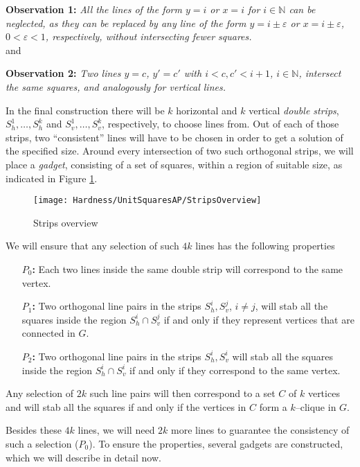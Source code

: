 \documentclass[12pt]{article}
\newcommand{\eps}{\varepsilon}
\newcommand{\N}{\mathbb{N}}
\begin{document}
\textbf{Observation 1:}
\emph{All the lines of the form $y = i$ or $x = i$ for $i \in \N$ can be neglected, as they can be replaced by any line of the form $y = i \pm \eps$ or $x = i \pm \eps$, $0 < \eps < 1$, respectively, without intersecting fewer squares.
}\\
and

\textbf{Observation 2:}
\emph{Two lines $y = c$, $y' = c'$ with $i < c, c' < i+1$, $i \in \N$, intersect the same squares, and analogously for vertical lines.}

In the final construction there will be $k$ horizontal and $k$ vertical \textit{double strips}, $S_h^1,\dots, S_h^k$ and $S_v^1,\dots, S_v^k$, respectively, to choose lines from. Out of each of those strips, two ``consistent'' lines will have to be chosen in order to get a solution of the specified size. Around every intersection of two such orthogonal strips, we will place a \textit{gadget}, consisting of a set of squares, within a region of suitable size, as indicated in Figure \ref{fig:StripsOverview}.
\begin{figure}[ht]
	\centering
		\texttt{[image: Hardness/UnitSquaresAP/StripsOverview]}
	\caption{Strips overview}
	\label{fig:StripsOverview}
\end{figure}
We will ensure that any selection of such $4k$ lines has the following properties 
\begin{itemize}
	\item[\textbf{$P_0$:}] Each two lines inside the same double strip will correspond to the same vertex.
	\item[\textbf{$P_1$:}] Two orthogonal line pairs in the strips $S_h^i, S_v^j$, $i \neq j$, will stab all the squares inside the region $S_h^i \cap S_v^j$ if and only if they represent vertices that are connected in $G$.
	\item[\textbf{$P_2$:}] Two orthogonal line pairs in the strips $S_h^i, S_v^i$ will stab all the squares inside the region $S_h^i \cap S_v^i$ if and only if they correspond to the same vertex.
\end{itemize}

Any selection of $2k$ such line pairs will then correspond to a set $C$ of $k$ vertices and will stab all the squares if and only if the vertices in $C$ form a $k$--clique in $G$. 

Besides these $4k$ lines, we will need $2k$ more lines to guarantee the consistency of such a selection ($P_0$). To ensure the properties, several gadgets are constructed, which we will describe in detail now.
\end{document}
